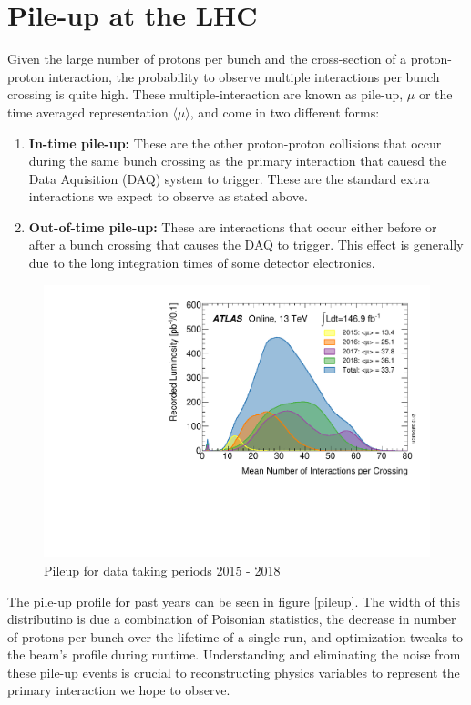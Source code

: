 \section{Pile-up at the LHC} \label{sec:lhc:pileup}

Given the large number of protons per bunch and the cross-section of a
proton-proton interaction, the probability to observe multiple interactions per
bunch crossing is quite high.  These multiple-interaction are known as pile-up,
$\mu$ or the time averaged representation $\langle \mu \rangle$, and come in two
different forms: 

\begin{enumerate} \item \textbf{In-time pile-up:} These are the other
proton-proton collisions that occur during the same bunch crossing as the
primary interaction that cauesd the Data Aquisition (DAQ) system to trigger.
These are the standard extra interactions we expect to observe as stated above.
\item \textbf{Out-of-time pile-up:} These are interactions that occur either
before or after a bunch crossing that causes the DAQ to trigger.  This effect is
generally due to the long integration times of some detector electronics.
\end{enumerate}

\begin{figure}[!htbp] 
  \begin{center}
    \includegraphics[width=0.9\linewidth]{figures/lhc/pileup.pdf}
    \caption{ Pileup for data taking periods 2015 - 2018} 
    \label{fig:pileup} 
  \end{center} 
\end{figure}

The pile-up profile for past years can be seen in figure \ref{pileup}.  The width of this
distributino is due a combination of Poisonian statistics, the decrease in
number of protons per bunch over the lifetime of a single run, and optimization
tweaks to the beam's profile during runtime.  Understanding and eliminating the
noise from these pile-up events is crucial to reconstructing physics variables
to represent the primary interaction we hope to observe.
